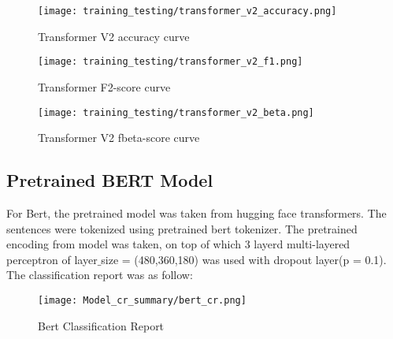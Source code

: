 \begin{figure}[H]
    \centering
    \texttt{[image: training\_testing/transformer\_v2\_accuracy.png]}
    \caption{Transformer V2 accuracy curve}
    \label{fig:Transformer V2 accuracy curve}
\end{figure}

\begin{figure}[H]
    \centering
    \texttt{[image: training\_testing/transformer\_v2\_f1.png]}
    \caption{Transformer F2-score curve}
    \label{fig:Transformer F2-score curve}
\end{figure}

\begin{figure}[H]
    \centering
    \texttt{[image: training\_testing/transformer\_v2\_beta.png]}
    \caption{Transformer V2 fbeta-score curve}
    \label{fig:Transformer V2 fbeta-score curve}
\end{figure}

\subsection{Pretrained BERT Model}
For Bert, the pretrained model was taken from hugging face transformers. The sentences were tokenized using pretrained bert tokenizer.
The pretrained encoding from model was taken, on top of which 3 layerd 
multi-layered 
perceptron of layer$\_$size 
= (480,360,180) 
was used with dropout layer(p = 0.1). The classification report was as follow:

\begin{figure}[H]
    \centering
    \texttt{[image: Model\_cr\_summary/bert\_cr.png]}
    \caption{Bert Classification Report}
    \label{fig:Bert Model Classification Report}
\end{figure}

